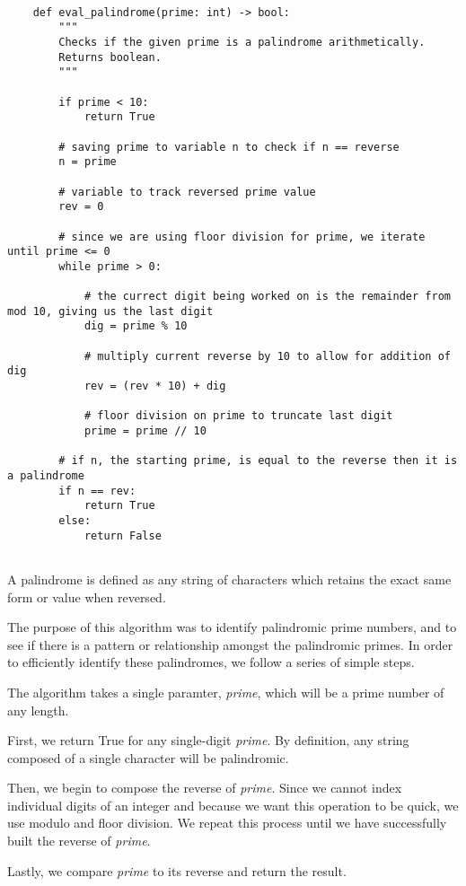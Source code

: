 \documentclass[11pt]{article}
\begin{document}
	
\lstset{style = Palindromes}

\begin{lstlisting}
	
	def eval_palindrome(prime: int) -> bool:
		"""
		Checks if the given prime is a palindrome arithmetically.
		Returns boolean.
		"""
		
		if prime < 10:
			return True
		
		# saving prime to variable n to check if n == reverse
		n = prime
		
		# variable to track reversed prime value
		rev = 0
		
		# since we are using floor division for prime, we iterate until prime <= 0
		while prime > 0:
			
			# the currect digit being worked on is the remainder from mod 10, giving us the last digit
			dig = prime % 10
			
			# multiply current reverse by 10 to allow for addition of dig
			rev = (rev * 10) + dig
			
			# floor division on prime to truncate last digit
			prime = prime // 10
		
		# if n, the starting prime, is equal to the reverse then it is a palindrome
		if n == rev:
			return True
		else:
			return False
		
\end{lstlisting}


A palindrome is defined as any string of characters which retains the exact same form or value when reversed.

The purpose of this algorithm was to identify palindromic prime numbers, and to see if there is a pattern or relationship amongst the palindromic primes. In order to efficiently identify these palindromes, we follow a series of simple steps.

The algorithm takes a single paramter, \textit{prime}, which will be a prime number of any length.

First, we return True for any single-digit \textit{prime}. By definition, any string composed of a single character will be palindromic.

Then, we begin to compose the reverse of \textit{prime}. Since we cannot index individual digits of an integer and because we want this operation to be quick, we use modulo and floor division. We repeat this process until we have successfully built the reverse of \textit{prime}.

Lastly, we compare \textit{prime }to its reverse and return the result.
\end{document}
